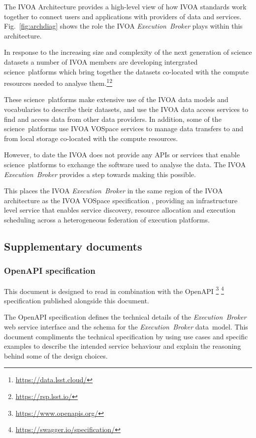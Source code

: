 \documentclass[11pt,a4paper]{ivoa}
\newcommand{\openapi} {OpenAPI}
\newcommand{\datamodel} {data~model}
\newcommand{\webservice} {web service}
\newcommand{\ivoa} {IVOA}
\newcommand{\vospace} {VOSpace}
\newcommand{\executionbroker} {\textit{Execution~Broker}}
\newcommand{\footurl}[1] {\footnote{\url{#1}}}
\newcommand{\dataset}[1] {dataset#1}
\newcommand{\scienceplatform}[1] {science~platform#1}
\begin{document}
The \ivoa{} Architecture\citep{2010ivoa.rept.1123A} provides a high-level view of how \ivoa{}
standards work together to connect users and applications with providers of data
and services.
Fig.~\ref{fig:archdiag} shows the role the \ivoa{} \executionbroker{} plays within this architecture.

In response to the increasing size and complexity of the next generation of science \dataset{s}
a number of \ivoa{} members are developing intergrated \scienceplatform{s} which bring
together the \dataset{s} co-located with the compute resources needed to analyse
them.\footurl{https://data.lsst.cloud/}\footurl{https://rsp.lsst.io/}

These \scienceplatform{s} make extensive use of the \ivoa{} data models and
vocabularies to describe their \dataset{s}, and use the \ivoa{} data access
services to find and access data from other data providers.
In addition, some of the \scienceplatform{s} use \ivoa{} \vospace{} services to manage
data transfers to and from local storage co-located with the compute resources.

However, to date the \ivoa{} does not provide any APIs or services that
enable \scienceplatform{s} to exchange the software used to analyse the data.
The \ivoa{} \executionbroker{} provides a step towards making this possible.

This places the \ivoa{} \executionbroker{} in the same region of the \ivoa{} architecture
as the \ivoa{} \vospace{} specification \citep{2009ivoa.specQ1007G},
providing an infrastructure level service that enables service discovery,
resource allocation and execution scheduling across a heterogeneous federation
of execution platforms.

\subsection{Supplementary documents}
\label{supplementary-documents}

\subsubsection{\openapi{} specification}
\label{openapi-specification}

This document is designed to read in combination with the \openapi{}
\footurl{https://www.openapis.org/} \footurl{https://swagger.io/specification/}
specification published alongside this document.

The \openapi{} specification defines the technical details of the
\executionbroker{} \webservice{} interface and the schema for the
\executionbroker{} \datamodel{}.
This document compliments the technical specification by using use cases
and specific examples to describe the intended service behaviour and
explain the reasoning behind some of the design choices.
\end{document}
